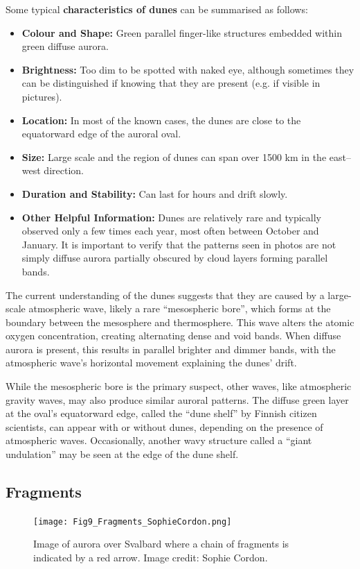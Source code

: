 \documentclass{article}
\newcommand{\contributed}[1]{%
    \par\noindent
    \begingroup
    \setlength{\leftskip}{1em}%
    \itshape
    Contributors: #1
    \par
    \endgroup
    \vspace{0.5em}
}
\begin{document}
Some typical {\bf characteristics of dunes} can be summarised as follows:
\begin{itemize}
    \item \textbf{Colour and Shape:} Green parallel finger-like structures embedded within green diffuse aurora.
    \item \textbf{Brightness:} Too dim to be spotted with naked eye, although sometimes they can be distinguished if knowing that they are present (e.g. if visible in pictures).
    \item \textbf{Location:} In most of the known cases, the dunes are close to the equatorward edge of the auroral oval.
    \item \textbf{Size:} Large scale and the region of dunes can span over 1500 km in the east--west direction.
    \item \textbf{Duration and Stability:} Can last for hours and drift slowly. 
    \item \textbf{Other Helpful Information:} Dunes are relatively rare and typically observed only a few times each year, most often between October and January. It is important to verify that the patterns seen in photos are not simply diffuse aurora partially obscured by cloud layers forming parallel bands.
    \end{itemize}

The current understanding of the dunes suggests that they are caused by a large-scale atmospheric wave, likely a rare ``mesospheric bore'', which forms at the boundary between the mesosphere and thermosphere. This wave alters the atomic oxygen concentration, creating alternating dense and void bands. When diffuse aurora is present, this results in parallel brighter and dimmer bands, with the atmospheric wave’s horizontal movement explaining the dunes' drift.

While the mesospheric bore is the primary suspect, other waves, like atmospheric gravity waves, may also produce similar auroral patterns. The diffuse green layer at the oval's equatorward edge, called the ``dune shelf'' by Finnish citizen scientists, can appear with or without dunes, depending on the presence of atmospheric waves. Occasionally, another wavy structure called a ``giant undulation'' may be seen at the edge of the dune shelf.

\subsection{Fragments}\label{fragments}
\begin{figure}
  \texttt{[image: Fig9\_Fragments\_SophieCordon.png]}
  \caption{Image of aurora over Svalbard where a chain of fragments is indicated by a red arrow. Image credit: Sophie Cordon.}
  \label{fig-fragmentsexample}
\end{figure}
\end{document}

